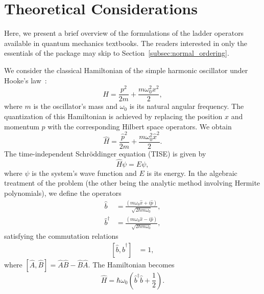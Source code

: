 \documentclass[5p, twocolumn, 10pt, sort&compress]{elsarticle}
\newcommand{\comm}[2]{\left[{#1},{#2}\right]}
\newcommand{\bop}{\hat{b}}
\newcommand{\bdag}{\bop^\dagger}
\begin{document}

\section{Theoretical Considerations}
\label{section:theoretical_considerations}

Here, we present a brief overview of the formulations of the ladder operators available in quantum mechanics textbooks. The readers interested in only the essentials of the package may skip to Section~\ref{subsec:normal_ordering}. 

We consider the classical Hamiltonian of the simple harmonic oscillator under Hooke's law~\cite{griffiths_introduction_2018}:
\begin{equation}
    H = \frac{p^2}{2m} + \frac{m\omega_0^2x^2}{2},
\end{equation}
where $m$ is the oscillator's mass and $\omega_0$ is its natural angular frequency. The quantization of this Hamiltonian is achieved by replacing the position $x$ and momentum $p$ with the corresponding Hilbert space operators. We obtain
\begin{equation}\label{eq:SHO_Ham}
    \hat{H} = \frac{\hat{p}^2}{2m} + \frac{m\omega_0^2\hat{x}^2}{2}.
\end{equation}
The time-independent Schr\"{od}dinger equation (TISE) is given by
\begin{equation}
    \hat{H}\psi = E\psi,
\end{equation}
where $\psi$ is the system's wave function and $E$ is its energy.  In the algebraic treatment of the problem (the other being the analytic method involving Hermite polynomials), we define the operators
\begin{subequations}
\begin{align}
    \bop &= \frac{\left(m\omega_0 \hat{x}+i\hat{p}\right)}{\sqrt{2\hbar m\omega_0}},
    \\
    \bdag &= \frac{\left(m\omega_0 \hat{x}-i\hat{p}\right)}{\sqrt{2\hbar m\omega_0}},
\end{align}
\end{subequations}
satisfying the commutation relations
\begin{align}
    \comm{\bop}{\bdag}&=1,
\end{align}
where $\comm{\hat{A}}{\hat{B}}=\hat{A}\hat{B}-\hat{B}\hat{A}$.  The Hamiltonian becomes
\begin{equation}
    \hat{H} = \hbar\omega_0\left(\bdag\bop+\frac{1}{2}\right).
\end{equation}
\end{document}
